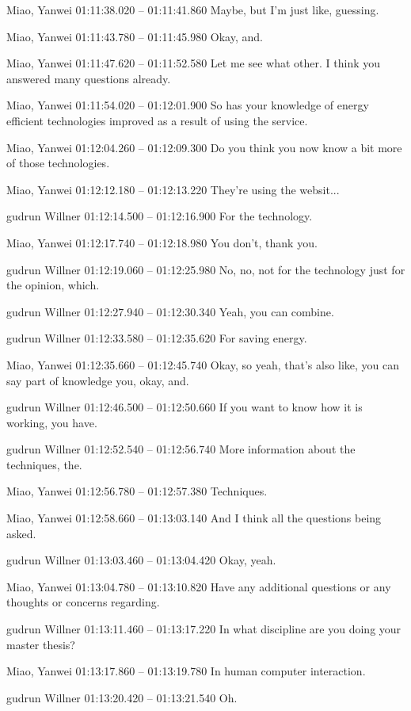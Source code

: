 {Miao, Yanwei 01:11:38.020 -- 01:11:41.860
Maybe, but I'm just like, guessing.

Miao, Yanwei 01:11:43.780 -- 01:11:45.980
Okay, and.

Miao, Yanwei 01:11:47.620 -- 01:11:52.580
Let me see what other. I think you answered many questions already.

Miao, Yanwei 01:11:54.020 -- 01:12:01.900
So has your knowledge of energy efficient technologies improved as a result of using the service.

Miao, Yanwei 01:12:04.260 -- 01:12:09.300
Do you think you now know a bit more of those technologies.

Miao, Yanwei 01:12:12.180 -- 01:12:13.220
They're using the websit...

gudrun Willner 01:12:14.500 -- 01:12:16.900
For the technology.

Miao, Yanwei 01:12:17.740 -- 01:12:18.980
You don't, thank you.

gudrun Willner 01:12:19.060 -- 01:12:25.980
No, no, not for the technology just for the opinion, which.

gudrun Willner 01:12:27.940 -- 01:12:30.340
Yeah, you can combine.

gudrun Willner 01:12:33.580 -- 01:12:35.620
For saving energy.

Miao, Yanwei 01:12:35.660 -- 01:12:45.740
Okay, so yeah, that's also like, you can say part of knowledge you, okay, and.

gudrun Willner 01:12:46.500 -- 01:12:50.660
If you want to know how it is working, you have.

gudrun Willner 01:12:52.540 -- 01:12:56.740
More information about the techniques, the.

Miao, Yanwei 01:12:56.780 -- 01:12:57.380
Techniques.

Miao, Yanwei 01:12:58.660 -- 01:13:03.140
And I think all the questions being asked.

gudrun Willner 01:13:03.460 -- 01:13:04.420
Okay, yeah.

Miao, Yanwei 01:13:04.780 -- 01:13:10.820
Have any additional questions or any thoughts or concerns regarding.

gudrun Willner 01:13:11.460 -- 01:13:17.220
In what discipline are you doing your master thesis?

Miao, Yanwei 01:13:17.860 -- 01:13:19.780
In human computer interaction.

gudrun Willner 01:13:20.420 -- 01:13:21.540
Oh.

}
